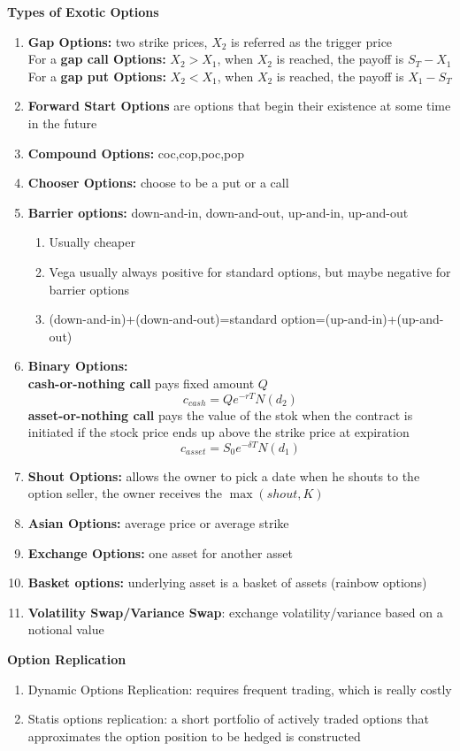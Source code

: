 \documentclass[11pt,fleqn]{report} %
\numberwithin{equation}{section} %
\numberwithin{figure}{section} %
\numberwithin{table}{section} %
\begin{document}
\begin{definition}\textbf{Types of Exotic Options}
\begin{enumerate}
    \item \textbf{Gap Options:} two strike prices, $X_2$ is referred as the trigger price\\
    For a \textbf{gap call Options:} $X_2>X_1$, when $X_2$ is reached, the payoff is $S_T-X_1$\\
    For a \textbf{gap put Options:} $X_2<X_1$, when $X_2$ is reached, the payoff is $X_1-S_T$
    \item \textbf{Forward Start Options} are options that begin their existence at some time in the future
    \item \textbf{Compound Options:} coc,cop,poc,pop
    \item \textbf{Chooser Options:} choose to be a put or a call
    \item \textbf{Barrier options:} down-and-in, down-and-out, up-and-in, up-and-out
    \begin{enumerate}
        \item Usually cheaper
        \item Vega usually always positive for standard options, but maybe negative for barrier options
        \item (down-and-in)+(down-and-out)=standard option=(up-and-in)+(up-and-out)
    \end{enumerate}
    \item \textbf{Binary Options:}\\
    \textbf{cash-or-nothing call} pays fixed amount $Q$
    $$
    c_{cash}=Qe^{-rT}N(d_2)
    $$
    \textbf{asset-or-nothing call} pays the value of the stok when the contract is initiated if the stock price ends up above the strike price at expiration
    $$
    c_{asset}=S_0e^{-\delta T}N(d_1)
    $$
    \item \textbf{Shout Options:} allows the owner to pick a date when he shouts to the option seller, the owner receives the $\max(shout,K)$
    \item \textbf{Asian Options:} average price or average strike
    \item \textbf{Exchange Options:} one asset for another asset
    \item \textbf{Basket options:} underlying asset is a basket of assets (rainbow options)
    \item \textbf{Volatility Swap/Variance Swap}: exchange volatility/variance based on a notional value
\end{enumerate}
\end{definition}
\begin{definition}\textbf{Option Replication}
\begin{enumerate}
    \item Dynamic Options Replication: requires frequent trading, which is really costly
    \item Statis options replication: a short portfolio of actively traded options that approximates the option position to be hedged is constructed
\end{enumerate}
\end{definition}
\end{document}
